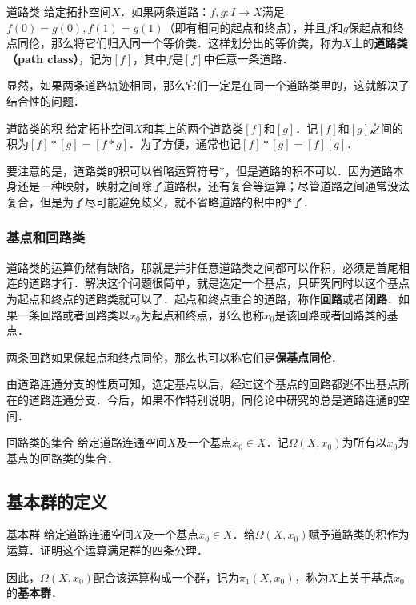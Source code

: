 \begin{definition}{道路类}
给定拓扑空间$X$．如果两条道路：$f, g:I\rightarrow X$满足$f(0)=g(0), f(1)=g(1)$（即有相同的起点和终点），并且$f$和$g$保起点和终点同伦，那么将它们归入同一个等价类．这样划分出的等价类，称为$X$上的\textbf{道路类（path class）}，记为$[f]$，其中$f$是$[f]$中任意一条道路．
\end{definition}

显然，如果两条道路轨迹相同，那么它们一定是在同一个道路类里的，这就解决了结合性的问题．

\begin{definition}{道路类的积}
给定拓扑空间$X$和其上的两个道路类$[f]$和$[g]$．记$[f]$和$[g]$之间的积为$[f]*[g]=[f*g]$．为了方便，通常也记$[f]*[g]=[f][g]$．
\end{definition}

要注意的是，道路类的积可以省略运算符号$*$，但是道路的积不可以．因为道路本身还是一种映射，映射之间除了道路积，还有复合等运算；尽管道路之间通常没法复合，但是为了尽可能避免歧义，就不省略道路的积中的$*$了．

\subsubsection{基点和回路类}

道路类的运算仍然有缺陷，那就是并非任意道路类之间都可以作积，必须是首尾相连的道路才行．解决这个问题很简单，就是选定一个基点，只研究同时以这个基点为起点和终点的道路类就可以了．起点和终点重合的道路，称作\textbf{回路}或者\textbf{闭路}．如果一条回路或者回路类以$x_0$为起点和终点，那么也称$x_0$是该回路或者回路类的基点．

两条回路如果保起点和终点同伦，那么也可以称它们是\textbf{保基点同伦}．

由道路连通分支的性质可知，选定基点以后，经过这个基点的回路都逃不出基点所在的道路连通分支．今后，如果不作特别说明，同伦论中研究的总是道路连通的空间．

\begin{definition}{回路类的集合}
给定道路连通空间$X$及一个基点$x_0\in X$．记$\Omega(X, x_0)$为所有以$x_0$为基点的回路类的集合．
\end{definition}

\subsection{基本群的定义}

\begin{exercise}{基本群}\label{Homt3_exe1}
给定道路连通空间$X$及一个基点$x_0\in X$．给$\Omega(X, x_0)$赋予道路类的积作为运算．证明这个运算满足群的四条公理．

因此，$\Omega(X, x_0)$配合该运算构成一个群，记为$\pi_1(X, x_0)$，称为$X$上关于基点$x_0$的\textbf{基本群}．
\end{exercise}

